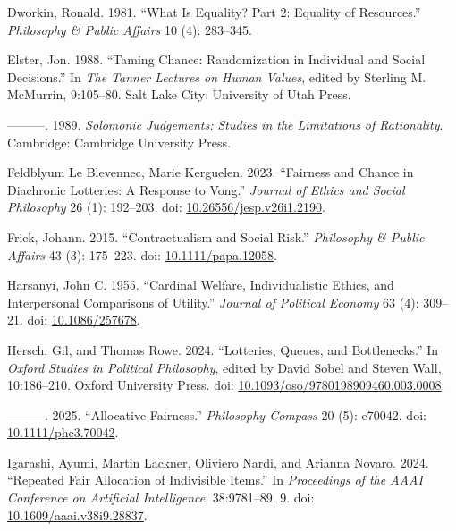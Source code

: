 \documentclass[
  11pt,
  letterpaper,
  DIV=11,
  numbers=noendperiod,
  twoside]{scrartcl}
\newlength{\cslhangindent}
\newenvironment{CSLReferences}[2] %
 {\begin{list}{}{%
  \setlength{\itemindent}{0pt}
  \setlength{\leftmargin}{0pt}
  \setlength{\parsep}{0pt}
  \ifodd #1
   \setlength{\leftmargin}{\cslhangindent}
   \setlength{\itemindent}{-1\cslhangindent}
  \fi
  \setlength{\itemsep}{#2\baselineskip}}}
 {\end{list}}
\begin{document}
\begin{CSLReferences}{1}{0}
Dworkin, Ronald. 1981. {``What Is Equality? Part 2: Equality of
Resources.''} \emph{Philosophy \& Public Affairs} 10 (4): 283--345.

Elster, Jon. 1988. {``Taming Chance: Randomization in Individual and
Social Decisions.''} In \emph{The Tanner Lectures on Human Values},
edited by Sterling M. McMurrin, 9:105--80. Salt Lake City: University of
Utah Press.

---------. 1989. \emph{Solomonic Judgements: Studies in the Limitations
of Rationality}. Cambridge: Cambridge University Press.

Feldblyum Le Blevennec, Marie Kerguelen. 2023. {``Fairness and Chance in
Diachronic Lotteries: A Response to Vong.''} \emph{Journal of Ethics and
Social Philosophy} 26 (1): 192--203. doi:
\href{https://doi.org/10.26556/jesp.v26i1.2190}{10.26556/jesp.v26i1.2190}.

Frick, Johann. 2015. {``Contractualism and Social Risk.''}
\emph{Philosophy \& Public Affairs} 43 (3): 175--223. doi:
\href{https://doi.org/10.1111/papa.12058}{10.1111/papa.12058}.

Harsanyi, John C. 1955. {``Cardinal Welfare, Individualistic Ethics, and
Interpersonal Comparisons of Utility.''} \emph{Journal of Political
Economy} 63 (4): 309--21. doi:
\href{https://doi.org/10.1086/257678}{10.1086/257678}.

Hersch, Gil, and Thomas Rowe. 2024. {``Lotteries, Queues, and
Bottlenecks.''} In \emph{Oxford Studies in Political Philosophy}, edited
by David Sobel and Steven Wall, 10:186--210. Oxford University Press.
doi:
\href{https://doi.org/10.1093/oso/9780198909460.003.0008}{10.1093/oso/9780198909460.003.0008}.

---------. 2025. {``Allocative Fairness.''} \emph{Philosophy Compass} 20
(5): e70042. doi:
\href{https://doi.org/10.1111/phc3.70042}{10.1111/phc3.70042}.

Igarashi, Ayumi, Martin Lackner, Oliviero Nardi, and Arianna Novaro.
2024. {``Repeated Fair Allocation of Indivisible Items.''} In
\emph{Proceedings of the AAAI Conference on Artificial Intelligence},
38:9781--89. 9. doi:
\href{https://doi.org/10.1609/aaai.v38i9.28837}{10.1609/aaai.v38i9.28837}.


\end{CSLReferences}
\end{document}
